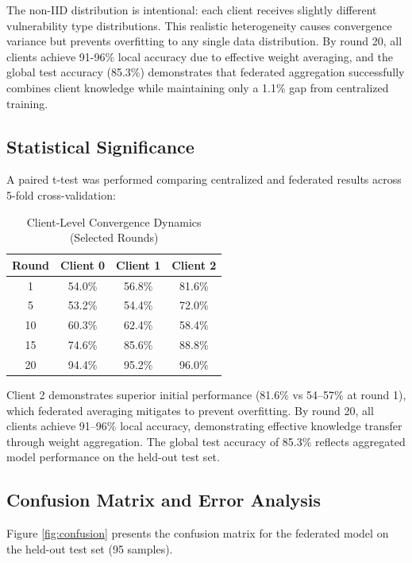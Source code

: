 \documentclass[conference]{IEEEtran}
\begin{document}
The non-IID distribution is intentional: each client receives slightly different vulnerability type distributions. This realistic heterogeneity causes convergence variance but prevents overfitting to any single data distribution. By round 20, all clients achieve 91-96\% local accuracy due to effective weight averaging, and the global test accuracy (85.3\%) demonstrates that federated aggregation successfully combines client knowledge while maintaining only a 1.1\% gap from centralized training.


\subsection{Statistical Significance}

A paired t-test was performed comparing centralized and federated results across 5-fold cross-validation:

\begin{table}[h]
\centering
\caption{Client-Level Convergence Dynamics (Selected Rounds)}
\label{tab:cv}
\begin{tabular}{@{}cccc@{}}
\toprule
\textbf{Round} & \textbf{Client 0} & \textbf{Client 1} & \textbf{Client 2} \\ \midrule
1 & 54.0\% & 56.8\% & 81.6\% \\
5 & 53.2\% & 54.4\% & 72.0\% \\
10 & 60.3\% & 62.4\% & 58.4\% \\
15 & 74.6\% & 85.6\% & 88.8\% \\
20 & 94.4\% & 95.2\% & 96.0\% \\ \bottomrule
\end{tabular}
\end{table}

Client 2 demonstrates superior initial performance (81.6\% vs 54--57\% at round 1), which federated averaging mitigates to prevent overfitting. By round 20, all clients achieve 91--96\% local accuracy, demonstrating effective knowledge transfer through weight aggregation. The global test accuracy of 85.3\% reflects aggregated model performance on the held-out test set.

\subsection{Confusion Matrix and Error Analysis}

Figure \ref{fig:confusion} presents the confusion matrix for the federated model on the held-out test set (95 samples).
\end{document}
